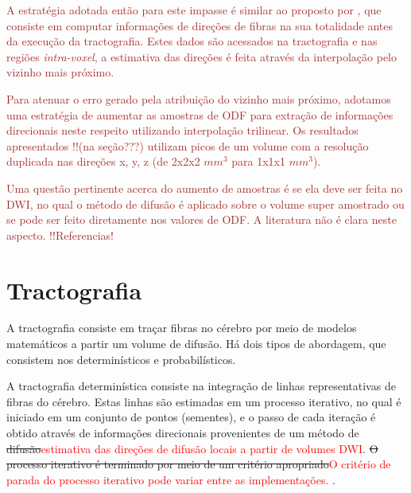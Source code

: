 \documentclass[
    12pt,                %
    oneside,            %
    a4paper,            %
    english,            %
    french,                %
    spanish,            %
    brazil                %
    ]{abntex2}
\begin{document}


\textcolor{brown}{
A estratégia adotada então para este impasse é similar ao proposto por , que consiste em computar informações de direções de fibras na sua totalidade antes da execução da tractografia. Estes dados são acessados na tractografia e nas regiões \textit{intra-voxel}, a estimativa das direções é feita através da interpolação pelo vizinho mais próximo.
}

\textcolor{brown}{
Para atenuar o erro gerado pela atribuição do vizinho mais próximo, adotamos uma estratégia de aumentar as amostras de ODF para extração de informações direcionais neste respeito utilizando interpolação trilinear. Os resultados apresentados !!(na seção???) utilizam picos de um volume com a resolução duplicada nas direções x, y, z (de 2x2x2 $mm^3$ para 1x1x1 $mm^3$).
}

\textcolor{brown}{
Uma questão pertinente acerca do aumento de amostras é se ela deve ser feita no DWI, no qual o método de difusão é aplicado sobre o volume super amostrado ou se pode ser feito diretamente nos valores de ODF. A literatura não é clara neste aspecto. !!Referencias!
}


\section{Tractografia}
\label{sec::decisoesiniciais_tractografia}

A tractografia consiste em traçar fibras no cérebro por meio de modelos matemáticos a partir um volume de difusão. Há dois tipos de abordagem, que consistem nos determinísticos e probabilísticos.

A tractografia determinística consiste na integração de linhas representativas de fibras do cérebro. Estas linhas são estimadas em um processo iterativo, no qual é iniciado em um conjunto de pontos (sementes), e o passo de cada iteração é obtido através de informações direcionais provenientes de um método de \sout{difusão}\textcolor{red}{estimativa das direções de difusão locais a partir de volumes DWI}. \sout{O processo iterativo é terminado por meio de um critério apropriado}\textcolor{red}{O critério de parada do processo iterativo pode variar entre as implementações.} \cite{tournier2011}.
\end{document}
